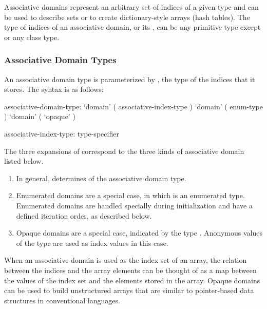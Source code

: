Associative domains represent an arbitrary set of indices
of a given type and can be used to describe sets or to create
dictionary-style arrays (hash tables).
The type of indices of an associative domain, or its ,
can be any primitive type except  or any class type.

\subsubsection{Associative Domain Types}

\label{Associative_Domain_Types}

An associative domain type is parameterized by , the
type of the indices that it stores.  The syntax is as follows:

\begin{syntax}
associative-domain-type:
  `domain' ( associative-index-type )
  `domain' ( enum-type )
  `domain' ( `opaque' )

associative-index-type:
  type-specifier
\end{syntax}

The three expansions of  correspond to the three
kinds of associative domain listed below.
\begin{enumerate} 
\item In general,  determines 
of the associative domain type.
\item Enumerated domains are a special case, in which 
is an enumerated type.  Enumerated domains are
handled specially during initialization and have a defined iteration
order, as described below.
\item Opaque domains are a special case, indicated by the type .
Anonymous values of the type  are used as index values
in this case.
\end{enumerate}

When an associative domain is used as the index set of an array, the relation
between the indices and the array elements can be thought of as a map between
the values of the index set and the elements stored in the array.
Opaque domains can be used to build unstructured arrays that are similar to
pointer-based data structures in conventional languages.

